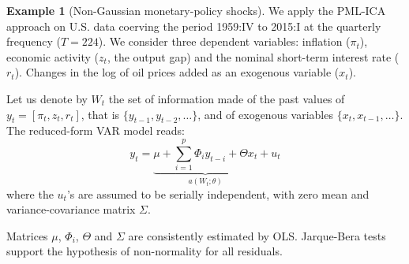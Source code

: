 \documentclass[
  12pt,
]{book}
\newenvironment{Shaded}{\begin{snugshade}}{\end{snugshade}}
\newcommand{\DecValTok}[1]{\textcolor[rgb]{0.00,0.00,0.81}{#1}}
\newcommand{\FunctionTok}[1]{\textcolor[rgb]{0.00,0.00,0.00}{#1}}
\newcommand{\NormalTok}[1]{#1}
\newcommand{\OtherTok}[1]{\textcolor[rgb]{0.56,0.35,0.01}{#1}}
\newcommand{\SpecialCharTok}[1]{\textcolor[rgb]{0.00,0.00,0.00}{#1}}
\newcommand{\StringTok}[1]{\textcolor[rgb]{0.31,0.60,0.02}{#1}}
\theoremstyle{definition}
\theoremstyle{definition}
\newtheorem{example}{Example}[chapter]
\theoremstyle{definition}
\theoremstyle{definition}
\theoremstyle{remark}
\begin{document}
\begin{example}[Non-Gaussian monetary-policy shocks]
\protect\hypertarget{exm:GMR2017}{}\label{exm:GMR2017}We apply the PML-ICA approach on U.S. data coerving the period 1959:IV to 2015:I at the quarterly frequency (\(T=224\)). We consider three dependent variables: inflation (\(\pi_t\)), economic activity (\(z_t\), the output gap) and the nominal short-term interest rate (\(r_t\)). Changes in the log of oil prices added as an exogenous variable (\(x_t\)).

\begin{Shaded}
\end{Shaded}

Let us denote by \(W_t\) the set of information made of the past values of \(y_t= [\pi_t,z_t,r_t]\), that is \(\{y_{t-1},y_{t-2},\dots\}\), and of exogenous variables \(\{x_{t},x_{t-1},\dots\}\). The reduced-form VAR model reads:
\[
y_t  = \underbrace{\mu + \sum_{i=1}^{p} \Phi_i y_{t-i} + \Theta x_t}_{a(W_t;\theta)} + u_t
\]
where the \(u_t\)'s are assumed to be serially independent, with zero mean and variance-covariance matrix \(\Sigma\).

Matrices \(\mu\), \(\Phi_i\), \(\Theta\) and \(\Sigma\) are consistently estimated by OLS. Jarque-Bera tests support the hypothesis of non-normality for all residuals.


\end{example}
\end{document}
